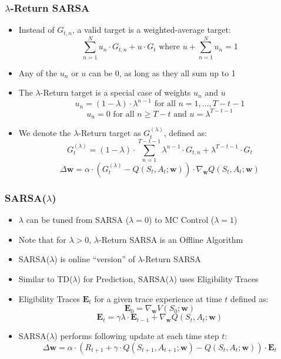 \documentclass[handout]{beamer}
\begin{document}
\begin{frame}
\frametitle{$\lambda$-Return SARSA}
\pause
\begin{itemize}[<+->]
\item Instead of $G_{t,n}$, a valid target is a weighted-average target:
$$\sum_{n=1}^N u_n \cdot G_{t,n} + u \cdot G_t \text{ where } u + \sum_{n=1}^N u_n = 1$$
\item Any of the $u_n$ or $u$ can be 0, as long as they all sum up to 1
\item The $\lambda$-Return target is a special case of weights $u_n$ and $u$
$$u_n = (1 - \lambda) \cdot \lambda^{n-1} \text{ for all } n = 1, \ldots, T-t-1$$
$$u_n = 0 \text{ for all } n \geq T-t \text{ and } u = \lambda^{T-t-1}$$
\item We denote the $\lambda$-Return target as $G_t^{(\lambda)}$, defined as:
$$G_t^{(\lambda)} = (1-\lambda) \cdot \sum_{n=1}^{T-t-1} \lambda^{n-1} \cdot G_{t,n} + \lambda^{T-t-1} \cdot G_t$$
$$\Delta \bm{w} = \alpha \cdot (G_t^{(\lambda)} - Q(S_t, A_t; \bm{w})) \cdot \nabla_{\bm{w}} Q(S_t, A_t; \bm{w})$$
\end{itemize}
\end{frame}

\begin{frame}
\frametitle{SARSA($\lambda$)}
\pause
\begin{itemize}[<+->]
\item $\lambda$ can be tuned from SARSA ($\lambda=0$) to MC Control ($\lambda=1$)
\item Note that for $\lambda > 0$, $\lambda$-Return SARSA is an Offline Algorithm
\item SARSA($\lambda$) is online ``version'' of $\lambda$-Return SARSA
\item Similar to TD($\lambda$) for Prediction, SARSA($\lambda$) uses Eligibility Traces
 \item Eligibility Traces $\bm{E}_t$ for a given trace experience at time $t$ defined as:
$$\bm{E}_0 = \nabla_{\bm{w}} V(S_0; \bm{w})$$
$$\bm{E}_t = \gamma \lambda \cdot \bm{E}_{t-1} + \nabla_{\bm{w}} Q(S_t,A_t;\bm{w})$$
\item SARSA($\lambda$) performs following update at each time step $t$:
$$\Delta \bm{w} = \alpha \cdot (R_{t+1} + \gamma \cdot Q(S_{t+1},A_{t+1};\bm{w}) - Q(S_t,A_t;\bm{w})) \cdot \bm{E}_t$$
\end{itemize}
\end{frame}
\end{document}
